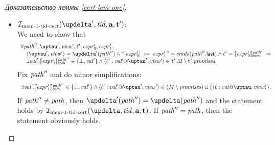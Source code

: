 \begin{proof}[Доказательство леммы \ref{cert-lem-one}]
\begin{itemize}
\begin{itemize}
        \item $\invMemZeroCERT(\delta', \tId, \aT, \tT')$: \\
          We need to show that
          \[\begin{array}{l}
      \forall \cpath'', \tau', \R', \loc', \expr'_0, \expr'_1. \\
\quad \angled{\tau', \R'} = \delta'(\cpath'') \land ``\writeInst{\expr'_0}{\expr'_1}" = \Cprom(\lastInstr{\cpath''}) \land
      \loc' = \semfcom{\expr'_0}{\cpath''} \Rightarrow \\
\quad \exists \stval'. \semfcom{\expr'_1}{\cpath''} \in \{\bot, \stval'\} \land
      \writeEvt{\loc'}{\stval'}{\tau'}{\R'} \in \tT'.\Mprom \setminus \tT'.\PromSet. \\
          \end{array}\]
          Fix $\mathit{path}''$ and do minor simplifications:
          \[\begin{array}{l}
      \exists \stval'. \semfcom{\expr'_1}{\cpath''} \in \{\bot, \stval'\} \land
      \writeEvt{\loc'}{\stval'}{\tau'}{\R'} \in (\Mprom \setminus \PromSet) \cup \{\writeEvt{\loc}{\stval}{\tau}{\R}\}. \\
          \end{array}\]
          If $\mathit{path}'' \not = \mathit{path}$, then $\delta'(\cpath'') = \delta(\cpath'')$ and the statement holds by
          $\invMemZeroCERT(\delta, \tId, \aT, \tT)$.
          If $\mathit{path}'' = \mathit{path}$, then the statement obviously holds.


\end{itemize}
\end{itemize}
\end{proof}

